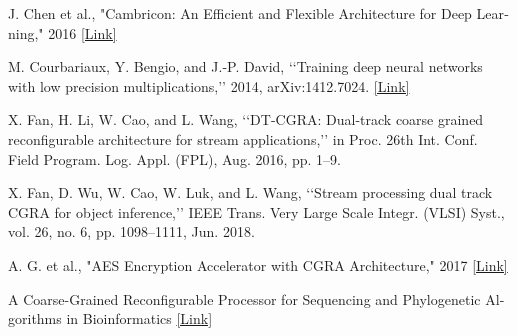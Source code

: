 \begin{latin}
	\begin{thebibliography}{9}
		J. Chen et al., "Cambricon: An Efficient and Flexible Architecture for Deep Learning," 2016
		\href{https://reconfigdeeplearning.wordpress.com/wp-content/uploads/2017/02/2016-isca_cambricon-an-instruction-set-architecture-for-neural-networks_cyj.pdf}{[Link]}
		
		
		M. Courbariaux, Y. Bengio, and J.-P. David, ‘‘Training deep neural networks with low precision multiplications,’’ 2014, arXiv:1412.7024.
		\href{http://arxiv.org/abs/1412.7024}{[Link]}
		
		X. Fan, H. Li, W. Cao, and L. Wang, ‘‘DT-CGRA: Dual-track coarse grained reconﬁgurable architecture for stream applications,’’ in Proc. 26th Int. Conf. Field Program. Log. Appl. (FPL), Aug. 2016, pp. 1–9.
		
		
		X. Fan, D. Wu, W. Cao, W. Luk, and L. Wang, ‘‘Stream processing dual track CGRA for object inference,’’ IEEE Trans. Very Large Scale Integr. (VLSI) Syst., vol. 26, no. 6, pp. 1098–1111, Jun. 2018.
		
		
		A. G. et al., "AES Encryption Accelerator with CGRA Architecture," 2017
		\href{https://www.cs.hiroshima-u.ac.jp/Proceedings23/CANDAR%202023/pdfs/CANDAR2023-1SROm9fDeMyoBrKU1vPn44/067000a189/067000a189.pdf}{[Link]}
		
		
		A Coarse-Grained Reconfigurable Processor for Sequencing and Phylogenetic Algorithms in Bioinformatics
		\href{https://ieeexplore.ieee.org/document/6128576}{[Link]}
		
		
	\end{thebibliography} 
\end{latin}